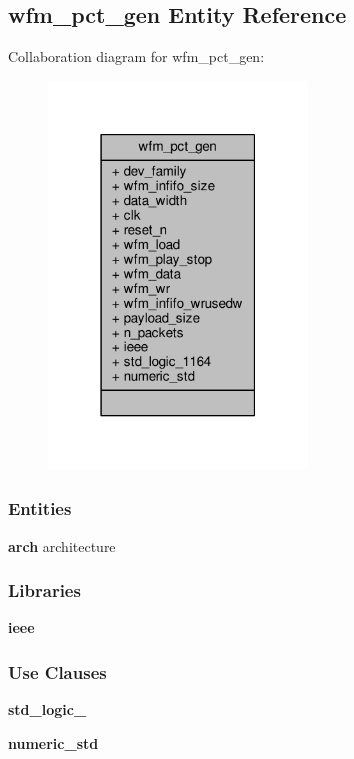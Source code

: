 \subsection{wfm\+\_\+pct\+\_\+gen Entity Reference}
\label{classwfm__pct__gen}


Collaboration diagram for wfm\+\_\+pct\+\_\+gen\+:\nopagebreak
\begin{figure}[H]
\begin{center}
\leavevmode
\includegraphics[width=195pt]{d4/d6b/classwfm__pct__gen__coll__graph}
\end{center}
\end{figure}
\subsubsection*{Entities}
\begin{DoxyCompactItemize}
\item 
{\bf arch} architecture
\end{DoxyCompactItemize}
\subsubsection*{Libraries}
 \begin{DoxyCompactItemize}
\item 
{\bf ieee} 
\end{DoxyCompactItemize}
\subsubsection*{Use Clauses}
 \begin{DoxyCompactItemize}
\item 
{\bf std\+\_\+logic\+\_}   
\item 
{\bf numeric\+\_\+std}   
\end{DoxyCompactItemize}
